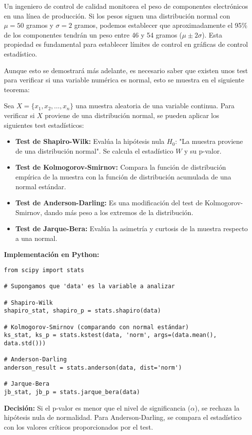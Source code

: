 \begin{example}
Un ingeniero de control de calidad monitorea el peso de componentes electrónicos en una línea de producción. Si los pesos siguen una distribución normal con $\mu = 50$ gramos y $\sigma = 2$ gramos, podemos establecer que aproximadamente el 95\% de los componentes tendrán un peso entre 46 y 54 gramos ($\mu \pm 2\sigma$). Esta propiedad es fundamental para establecer límites de control en gráficas de control estadístico.
\end{example}

Aunque esto se demostrará más adelante, es necesario saber que existen unos test para verificar si una variable numérica es normal, esto se muestra en el siguiente teorema: 

\begin{theorem}
Sea \( X = \{x_1, x_2, \ldots, x_n\} \) una muestra aleatoria de una variable continua. Para verificar si \( X \) proviene de una distribución normal, se pueden aplicar los siguientes test estadísticos:

\begin{itemize}
    \item \textbf{Test de Shapiro-Wilk:} Evalúa la hipótesis nula \( H_0 \): "La muestra proviene de una distribución normal". Se calcula el estadístico \( W \) y su p-valor.
    \item \textbf{Test de Kolmogorov-Smirnov:} Compara la función de distribución empírica de la muestra con la función de distribución acumulada de una normal estándar.
    \item \textbf{Test de Anderson-Darling:} Es una modificación del test de Kolmogorov-Smirnov, dando más peso a los extremos de la distribución.
    \item \textbf{Test de Jarque-Bera:} Evalúa la asimetría y curtosis de la muestra respecto a una normal.
\end{itemize}

\textbf{Implementación en Python:}

\begin{verbatim}
from scipy import stats

# Supongamos que 'data' es la variable a analizar

# Shapiro-Wilk
shapiro_stat, shapiro_p = stats.shapiro(data)

# Kolmogorov-Smirnov (comparando con normal estándar)
ks_stat, ks_p = stats.kstest(data, 'norm', args=(data.mean(), data.std()))

# Anderson-Darling
anderson_result = stats.anderson(data, dist='norm')

# Jarque-Bera
jb_stat, jb_p = stats.jarque_bera(data)
\end{verbatim}

\textbf{Decisión:} Si el p-valor es menor que el nivel de significancia (\( \alpha \)), se rechaza la hipótesis nula de normalidad. Para Anderson-Darling, se compara el estadístico con los valores críticos proporcionados por el test.
\end{theorem}

